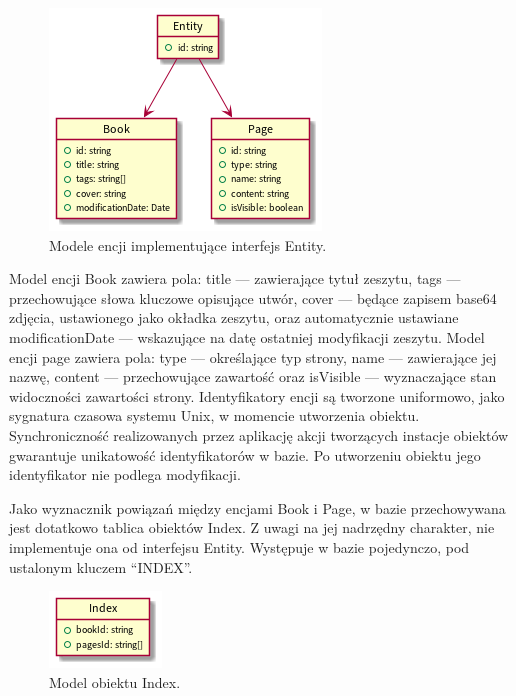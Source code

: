 \begin{figure}[H]
	\begin{center}
		\includegraphics[scale=0.9]{media/Entity.png}
	\end{center}
	\caption{Modele encji implementujące interfejs Entity.}
	\label{rys:entity}
\end{figure}

Model encji Book zawiera pola: title — zawierające tytuł zeszytu, tags — przechowujące słowa kluczowe opisujące utwór,
cover — będące zapisem base64 zdjęcia, ustawionego jako okładka zeszytu, oraz automatycznie ustawiane modificationDate — wskazujące
na datę ostatniej modyfikacji zeszytu.
Model encji page zawiera pola: type — określające typ strony, name — zawierające jej nazwę, content — przechowujące zawartość oraz
isVisible — wyznaczające stan widoczności zawartości strony.
Identyfikatory encji są tworzone uniformowo, jako sygnatura czasowa systemu Unix, w momencie utworzenia obiektu.
Synchroniczność realizowanych przez aplikację akcji tworzących instacje obiektów gwarantuje unikatowość identyfikatorów w bazie.
Po utworzeniu obiektu jego identyfikator nie podlega modyfikacji.

Jako wyznacznik powiązań między encjami Book i Page, w bazie przechowywana jest dotatkowo tablica obiektów Index.
Z uwagi na jej nadrzędny charakter, nie implementuje ona od interfejsu Entity. Występuje w bazie pojedynczo, pod ustalonym
kluczem \enquote{INDEX}.

\begin{figure}[H]
	\begin{center}
		\includegraphics[scale=0.9]{media/Index.png}
	\end{center}
	\caption{Model obiektu Index.}
	\label{rys:index}
\end{figure}


